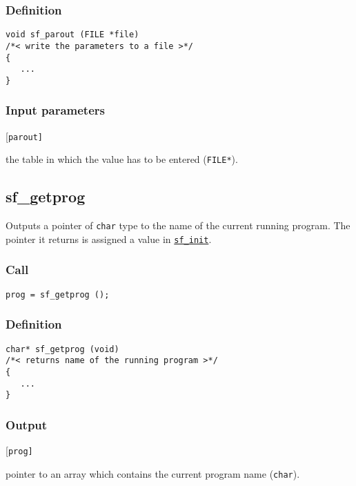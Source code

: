 \subsubsection*{Definition}
\begin{verbatim}
void sf_parout (FILE *file)
/*< write the parameters to a file >*/
{
   ...
}
\end{verbatim}

\subsubsection*{Input parameters}
\begin{desclist}{\tt }{\quad}[\tt parout]
   \setlength\itemsep{0pt}
   \item[parout] the table in which the value has to be entered (\texttt{FILE*}).
\end{desclist}




\subsection{{sf\_getprog}}
Outputs a pointer of \texttt{char} type to the name of the current running program. The pointer it returns is assigned a value in \hyperref[sec:sf_init]{\texttt{sf\_init}}.

\subsubsection*{Call}
\begin{verbatim}
prog = sf_getprog ();
\end{verbatim}

\subsubsection*{Definition}
\begin{verbatim}
char* sf_getprog (void) 
/*< returns name of the running program >*/ 
{
   ...
}
\end{verbatim}

\subsubsection*{Output}
\begin{desclist}{\tt }{\quad}[\tt prog]
   \setlength\itemsep{0pt}
   \item[prog] pointer to an array which contains the current program name (\texttt{char}).
\end{desclist}




